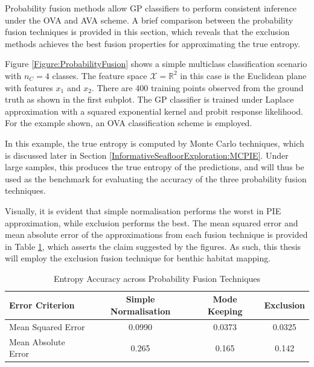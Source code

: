				Probability fusion methods allow GP classifiers to perform consistent inference under the OVA and AVA scheme. A brief comparison between the probability fusion techniques is provided in this section, which reveals that the exclusion methods achieves the best fusion properties for approximating the true entropy.
						
				Figure \ref{Figure:ProbabilityFusion} shows a simple multiclass classification scenario with $n_{C} = 4$ classes. The feature space $\mathcal{X} = \mathbb{R}^{2}$ in this case is the Euclidean plane with features $x_{1}$ and $x_{2}$. There are 400 training points observed from the ground truth as shown in the first subplot. The GP classifier is trained under Laplace approximation with a squared exponential kernel and probit response likelihood. For the example shown, an OVA classification scheme is employed.
				
				In this example, the true entropy is computed by Monte Carlo techniques, which is discussed later in Section \ref{InformativeSeafloorExploration:MCPIE}. Under large samples, this produces the true entropy of the predictions, and will thus be used as the benchmark for evaluating the accuracy of the three probability fusion techniques.
				
				Visually, it is evident that simple normalisation performs the worst in PIE approximation, while exclusion performs the best. The mean squared error and mean absolute error of the approximations from each fusion technique is provided in Table \ref{Table:ProbabilityFusionAccuracy}, which asserts the claim suggested by the figures. As such, this thesis will employ the exclusion fusion technique for benthic habitat mapping.
						
				\begin{table}[t]
					{\footnotesize
					\begin{center}
						\begin{tabular}{ l c c c }
						\hline
						Error Criterion & Simple Normalisation & Mode Keeping & Exclusion \\
						\hline
						Mean Squared Error & 0.0990 & 0.0373 & 0.0325 \\
						Mean Absolute Error & 0.265 & 0.165 & 0.142 \\
						\hline
						\end{tabular}
					\end{center}
					}
			  	\caption{Entropy Accuracy across Probability Fusion Techniques}
			  	\label{Table:ProbabilityFusionAccuracy}
			  	\end{table}	


